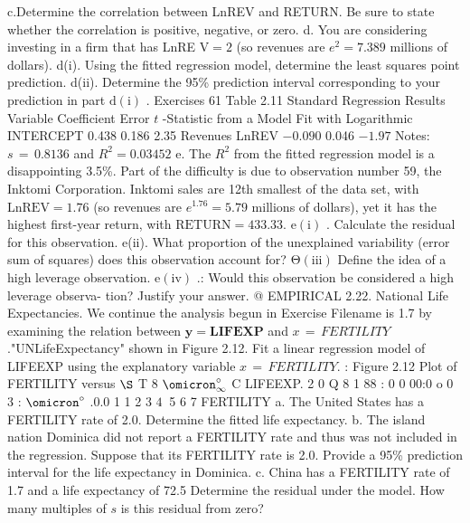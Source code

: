 \documentclass[11pt]{article}
\begin{document}
 c.Determine the correlation between LnREV and RETURN. Be sure to
state whether the correlation is positive, negative, or zero.
 d. You are considering investing in a firm that has LnRE \(\mathrm{V}=2\) (so revenues
are \(e^{2}=7 . 3 8 9\) millions of dollars).
d(i). Using the fitted regression model, determine the least squares
point prediction.
d(ii). Determine the 95\% prediction interval corresponding to your
 prediction in part \(\mathrm{d ( i )}\) .
 Exercises 61
Table 2.11
Standard Regression Results
 Variable Coefficient Error \(t\) -Statistic from a Model Fit with
Logarithmic
INTERCEPT 0.438 0.186 2.35 Revenues
LnREV \(- 0 . 0 9 0\) 0.046 \(- 1 . 9 7\)
Notes: \(s \,=\, 0 . 8 1 3 6\) and \(R^{2}=0 . 0 3 4 5 2\)
e. The \(R^{2}\) from the fitted regression model is a disappointing 3.5\%. Part of 
 the difficulty is due to observation number 59, the Inktomi Corporation.
Inktomi sales are 12th smallest of the data set, with \(\mathrm{L n R E V}=1 . 7 6\)
(so revenues are \(e^{1 . 7 6}=5 . 7 9\) millions of dollars), yet it has the highest
first-year return, with \(\mathrm{R E T U R N}=4 3 3 . 3 3 .\)
\(\mathrm{e ( i )}\) . Calculate the residual for this observation.
e(ii). What proportion of the unexplained variability (error sum of
 squares) does this observation account for?
\(\mathrm{\Theta( i i i )}\) Define the idea of a high leverage observation.
\(\mathrm{e ( i v )}\) .: Would this observation be considered a high leverage observa-
tion? Justify your answer. @ EMPIRICAL
2.22. National Life Expectancies. We continue the analysis begun in Exercise Filename is
1.7 by examining the relation between \(\boldsymbol{y}=\boldsymbol{L} \boldsymbol{I} \boldsymbol{F} \boldsymbol{E} \boldsymbol{X} \boldsymbol{P}\) and \(x \,=\, F E R T I L I T Y\) ."UNLifeExpectancy"
 shown in Figure 2.12. Fit a linear regression model of LIFEEXP using the
 explanatory variable \(x \,=\, F E R T I L I T Y .\)
: Figure 2.12 Plot of 
FERTILITY versus
\(\S\) T 8 \(\omicron_{\infty}^{\circ}\) C LIFEEXP.
2 0 Q 8
1
88
: 0 0
00:0
o 0
3 : \(\omicron^{\circ}\) .0.0
1
1 2 3 \(4 ~\) 5 6 7
FERTILITY
 a. The United States has a FERTILITY rate of 2.0. Determine the fitted
life expectancy.
b. The island nation Dominica did not report a FERTILITY rate and thus
was not included in the regression. Suppose that its FERTILITY rate
is 2.0. Provide a 95\% prediction interval for the life expectancy in
Dominica.
c. China has a FERTILITY rate of 1.7 and a life expectancy of 72.5
 Determine the residual under the model. How many multiples of \(s\) is
 this residual from zero?
\clearpage
\end{document}
